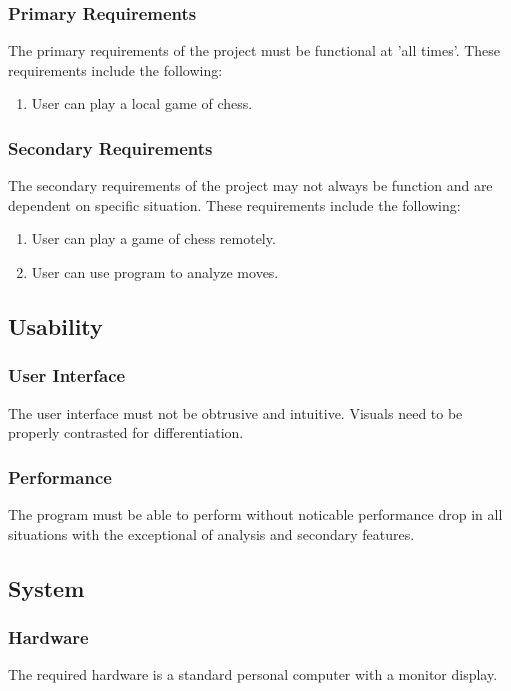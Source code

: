 \documentclass{article}
\begin{document}
\subsubsection{Primary Requirements}
The primary requirements of the project must be functional at 'all times'. These requirements include the following:
\begin{enumerate}
\item User can play a local game of chess.
\end{enumerate}


\subsubsection{Secondary Requirements}
The secondary requirements of the project may not always be function and are dependent on specific situation. These requirements include the following:
\begin{enumerate}
\item User can play a game of chess remotely.
\item User can use program to analyze moves.
\end{enumerate}
\subsection{Usability}
\subsubsection{User Interface}
The user interface must not be obtrusive and intuitive. Visuals need to be properly contrasted for differentiation. 
\subsubsection{Performance}
The program must be able to perform without noticable performance drop in all situations with the exceptional of analysis and secondary features.
\subsection{System}
\subsubsection{Hardware}
The required hardware is a standard personal computer with a monitor display.
\end{document}
